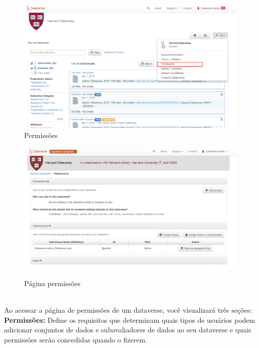 \documentclass[12pt,hidelinks]{article}
\begin{document}
\newpage

\begin{figure}[H]
\caption{Permissões}
\centering
    \includegraphics[width=1.0\textwidth]{imagens/prt1.png}
    
    \label{Permissões}
\end{figure}

\begin{figure}[H]
\caption{Página permissões}
\centering
    \includegraphics[width=1.0\textwidth]{Prints/NOVOTIR.png}
    \label{Permissões 2}
\end{figure}
\\

Ao acessar a página de permissões de um dataverse, você visualizará três seções:\\

\textbf{Permissões:} Define os requisitos que determinam quais tipos de usuários podem adicionar conjuntos de dados e subavaliadores de dados ao seu dataverse e quais permissões serão concedidas quando o fizerem.\\
\end{document}
